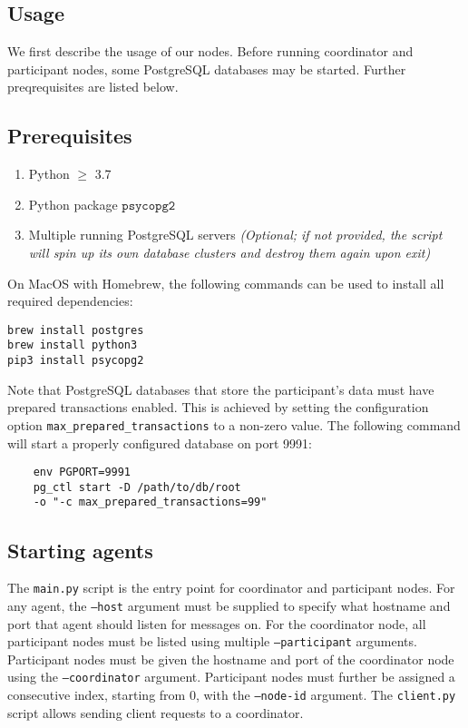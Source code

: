 \documentclass{article}
\begin{document}
\begin{multicols}{2}

\section{Usage}

We first describe the usage of our nodes. Before running
coordinator and participant nodes, some PostgreSQL databases
may be started. Further preqrequisites are listed below.

\subsection{Prerequisites}

\begin{enumerate}
    \item Python $\geq$ 3.7
    \item Python package $\texttt{psycopg2}$
    \item Multiple running PostgreSQL servers
    \textit{(Optional; if not provided, the script will
    spin up its own database clusters and destroy them again
    upon exit)}
\end{enumerate}

On MacOS with Homebrew, the following commands can be used
to install all required dependencies:
\begin{verbatim}
brew install postgres
brew install python3
pip3 install psycopg2
\end{verbatim}

Note that PostgreSQL databases that store the participant's
data must have prepared transactions enabled. This is 
achieved by setting the configuration option
\texttt{max\_prepared\_transactions} to a non-zero value.
The following command will start a properly configured 
database on port 9991:
\begin{verbatim}
    env PGPORT=9991
    pg_ctl start -D /path/to/db/root
    -o "-c max_prepared_transactions=99"
\end{verbatim}

\subsection{Starting agents}

The \texttt{main.py} script is the entry point for 
coordinator and participant nodes. For any agent, the
\texttt{--host} argument must be supplied to specify what
hostname and port that agent should listen for messages on.
For the coordinator node, all participant nodes must be
listed using multiple \texttt{--participant} arguments. 
Participant nodes must be given the hostname and port of
the coordinator node using the \texttt{--coordinator} 
argument. Participant nodes must further be assigned a
consecutive index, starting from 0, with the
\texttt{--node-id} argument. The \texttt{client.py}
script allows sending client requests to a coordinator.


\end{multicols}
\end{document}
